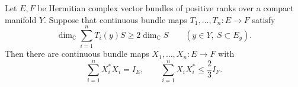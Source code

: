 \begin{lemma}
\label{lem:scaling}
Let $E,F$ be Hermitian complex vector bundles of positive ranks over a
compact manifold $Y$.  Suppose that continuous bundle maps
$T_1,\ldots,T_n:E\to F$ satisfy
\begin{equation}
  \dim_{\mathbb C}\sum_{i=1}^n T_i(y)S
  \geq 2\dim_{\mathbb C}S
  \qquad (y\in Y,\ S\subset E_y).
  \label{eq:expansion}
\end{equation}
Then there are continuous bundle maps $X_1,\ldots,X_n:E\to F$ with
\begin{equation}
  \sum_{i=1}^nX_i^*X_i=I_E,
  \qquad
  \sum_{i=1}^nX_iX_i^*\leq\frac23 I_F.
  \label{eq:scaled-bounds}
\end{equation}
\end{lemma}

